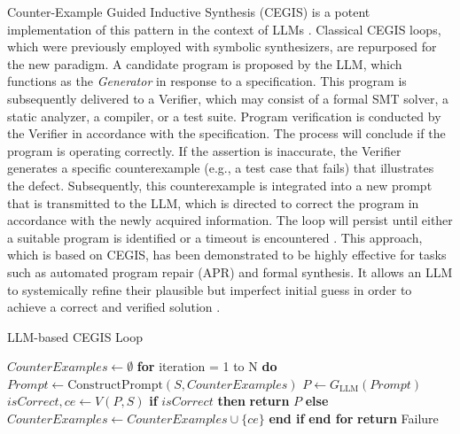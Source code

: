 \documentclass[12pt, a4paper]{report}
\begin{document}
Counter-Example Guided Inductive Synthesis (CEGIS) is a potent implementation of this pattern in the context of LLMs \citep{kaplan2020scaling}. Classical CEGIS loops, which were previously employed with symbolic synthesizers, are repurposed for the new paradigm. A candidate program is proposed by the LLM, which functions as the \textit{Generator} in response to a specification. This program is subsequently delivered to a Verifier, which may consist of a formal SMT solver, a static analyzer, a compiler, or a test suite. Program verification is conducted by the Verifier in accordance with the specification. The process will conclude if the program is operating correctly. If the assertion is inaccurate, the Verifier generates a specific counterexample (e.g., a test case that fails) that illustrates the defect. Subsequently, this counterexample is integrated into a new prompt that is transmitted to the LLM, which is directed to correct the program in accordance with the newly acquired information. The loop will persist until either a suitable program is identified or a timeout is encountered \citep{chen2021evaluating}. This approach, which is based on CEGIS, has been demonstrated to be highly effective for tasks such as automated program repair (APR) and formal synthesis. It allows an LLM to systemically refine their plausible but imperfect initial guess in order to achieve a correct and verified solution \citep{devlin2017robustfill}.

\begin{algorithm}
\caption{LLM-based CEGIS Loop}
\label{alg:llm_cegis}
\begin{algorithmic}[1]
\STATE $\textit{CounterExamples} \leftarrow \emptyset$
\STATE \textbf{for} iteration = 1 to N \textbf{do}
\STATE \quad {}
\STATE \quad $\textit{Prompt} \leftarrow \text{ConstructPrompt}(S, \textit{CounterExamples})$
\STATE \quad $P \leftarrow G_{\text{LLM}}(\textit{Prompt})$
\STATE
\STATE \quad {}
\STATE \quad $\textit{isCorrect}, ce \leftarrow V(P, S)$
\STATE
\STATE \quad \textbf{if} $\textit{isCorrect}$ \textbf{then}
\STATE \quad \quad \textbf{return} $P$
\STATE \quad \textbf{else}
\STATE \quad \quad $\textit{CounterExamples} \leftarrow \textit{CounterExamples} \cup \{ce\}$
\STATE \quad \textbf{end if}
\STATE \textbf{end for}
\STATE \textbf{return} Failure
\end{algorithmic}
\end{algorithm}
\end{document}
